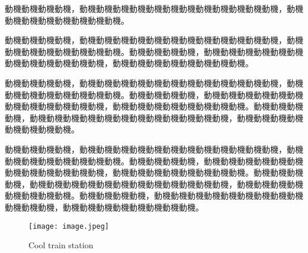 \begin{ZhChapter}
動機動機動機動機，動機動機動機動機動機動機動機動機動機動機動機動機，動機動機動機動機動機動機動機動機。

動機動機動機動機，動機動機動機動機動機動機動機動機動機動機動機動機，動機動機動機動機動機動機動機動機。動機動機動機動機，動機動機動機動機動機動機動機動機動機動機動機動機，動機動機動機動機動機動機動機動機。

動機動機動機動機，動機動機動機動機動機動機動機動機動機動機動機動機，動機動機動機動機動機動機動機動機。動機動機動機動機，動機動機動機動機動機動機動機動機動機動機動機動機，動機動機動機動機動機動機動機動機。動機動機動機動機，動機動機動機動機動機動機動機動機動機動機動機動機，動機動機動機動機動機動機動機動機。

動機動機動機動機，動機動機動機動機動機動機動機動機動機動機動機動機，動機動機動機動機動機動機動機動機。動機動機動機動機，動機動機動機動機動機動機動機動機動機動機動機動機，動機動機動機動機動機動機動機動機。動機動機動機動機，動機動機動機動機動機動機動機動機動機動機動機動機，動機動機動機動機動機動機動機動機。動機動機動機動機，動機動機動機動機動機動機動機動機動機動機動機動機，動機動機動機動機動機動機動機動機。

\begin{figure*}[htbp]
    \centering
    \texttt{[image: image.jpeg]}
    \caption{Cool train station}
    \label{fig: image}
\end{figure*}

\end{ZhChapter}